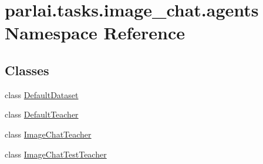 \hypertarget{namespaceparlai_1_1tasks_1_1image__chat_1_1agents}{}\section{parlai.\+tasks.\+image\+\_\+chat.\+agents Namespace Reference}
\label{namespaceparlai_1_1tasks_1_1image__chat_1_1agents}
\subsection*{Classes}
\begin{DoxyCompactItemize}
\item 
class \hyperlink{classparlai_1_1tasks_1_1image__chat_1_1agents_1_1DefaultDataset}{Default\+Dataset}
\item 
class \hyperlink{classparlai_1_1tasks_1_1image__chat_1_1agents_1_1DefaultTeacher}{Default\+Teacher}
\item 
class \hyperlink{classparlai_1_1tasks_1_1image__chat_1_1agents_1_1ImageChatTeacher}{Image\+Chat\+Teacher}
\item 
class \hyperlink{classparlai_1_1tasks_1_1image__chat_1_1agents_1_1ImageChatTestTeacher}{Image\+Chat\+Test\+Teacher}
\end{DoxyCompactItemize}
